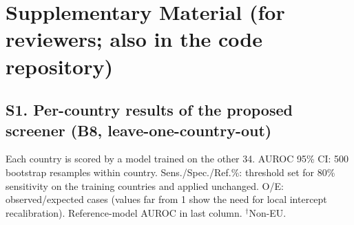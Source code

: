 \clearpage
\section*{Supplementary Material (for reviewers; also in the code repository)}
\subsection*{S1. Per-country results of the proposed screener (B8, leave-one-country-out)}
Each country is scored by a model trained on the other 34. AUROC 95\% CI: 500 bootstrap resamples within country. Sens./Spec./Ref.\%: threshold set for 80\% sensitivity on the training countries and applied unchanged. O/E: observed/expected cases (values far from 1 show the need for local intercept recalibration). Reference-model AUROC in last column. $^\dagger$Non-EU.
